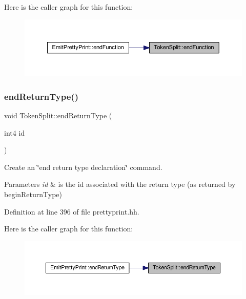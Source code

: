 Here is the caller graph for this function\+:
\nopagebreak
\begin{figure}[H]
\begin{center}
\leavevmode
\includegraphics[width=350pt]{class_token_split_a1be7d58dbc149fc75b6467e3c02ddb65_icgraph}
\end{center}
\end{figure}
\mbox{\label{class_token_split_a50c3b76f86a75f425879ceba2589b843}} 
\subsubsection{\texorpdfstring{endReturnType()}{endReturnType()}}
{\footnotesize\ttfamily void Token\+Split\+::end\+Return\+Type (\begin{DoxyParamCaption}\item[{int4}]{id }\end{DoxyParamCaption})\hspace{0.3cm}{\ttfamily [inline]}}



Create an \char`\"{}end return type declaration\char`\"{} command. 


\begin{DoxyParams}{Parameters}
{\em id} & is the id associated with the return type (as returned by begin\+Return\+Type) \\
\hline
\end{DoxyParams}


Definition at line 396 of file prettyprint.\+hh.

Here is the caller graph for this function\+:
\nopagebreak
\begin{figure}[H]
\begin{center}
\leavevmode
\includegraphics[width=350pt]{class_token_split_a50c3b76f86a75f425879ceba2589b843_icgraph}
\end{center}
\end{figure}
\mbox{\label{class_token_split_a33dd0d763dc8042bc3fca66fddff0b9b}} 
